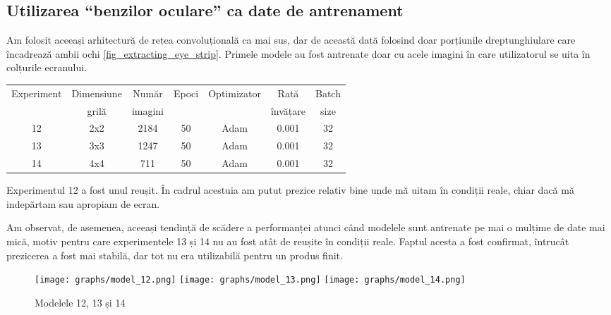 \subsection{Utilizarea ``benzilor oculare'' ca date de antrenament}
Am folosit aceeași arhitectură de rețea convoluțională ca mai sus, dar de această dată folosind doar porțiunile dreptunghiulare care încadrează ambii ochi \ref{fig_extracting_eye_strip}.
Primele modele au fost antrenate doar cu acele imagini în care utilizatorul se uita în colțurile ecranului.

\begin{center}
    \begin{tabular}{ c | c | c | c | c | c | c }
        \hline
        Experiment & Dimensiune & Număr   & Epoci & Optimizator & Rată     & Batch \\ 
                   & grilă      & imagini &       &             & învățare & size  \\ 
        \hline
        12 & 2x2 & 2184 & 50 & Adam & 0.001 & 32 \\
        \hline
        13 & 3x3 & 1247 & 50 & Adam & 0.001 & 32 \\
        \hline
        14 & 4x4 & 711 & 50 & Adam & 0.001 & 32 \\
        \hline
    \end{tabular}
\end{center}

Experimentul 12 a fost unul reușit.
În cadrul acestuia am putut prezice relativ bine unde mă uitam în condiții reale, chiar dacă mă indepărtam sau apropiam de ecran.

Am observat, de asemenea, aceeași tendință de scădere a performanței atunci când modelele sunt antrenate pe mai o mulțime de date mai mică, motiv pentru care experimentele 13 și 14 nu au fost atât de reușite în condiții reale.
Faptul acesta a fost confirmat, întrucât prezicerea a fost mai stabilă, dar tot nu era utilizabilă pentru un produs finit.

\begin{figure}
    \centering
    \texttt{[image: graphs/model\_12.png]}
    \texttt{[image: graphs/model\_13.png]}
    \texttt{[image: graphs/model\_14.png]}
    \caption{Modelele 12, 13 și 14}
\end{figure}


